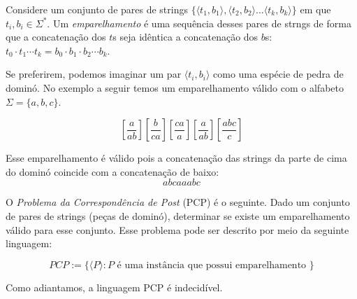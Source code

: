\begin{example}
  Considere um conjunto de pares de strings $\{\langle t_1, b_1 \rangle, \langle t_2, b_2 \rangle \dots \langle t_k, b_k \rangle\}$ em que $t_i, b_i \in \Sigma^*$.
  Um {\em emparelhamento} é uma sequência desses pares de strngs de forma que a concatenação dos $t$s seja idêntica a concatenação dos $b$s: $t_0 \cdot t_1 \cdots t_k = b_0 \cdot b_1 \cdot b_2 \cdots b_k$.

  Se preferirem, podemos imaginar um par $\langle t_i, b_i \rangle$ como uma espécie de pedra de dominó.
  No exemplo a seguir temos um emparelhamento válido com o alfabeto $\Sigma = \{a,b,c\}$.

  \begin{displaymath}
    \left[\frac{a}{ab}\right] \left[\frac{b}{ca}\right] \left[\frac{ca}{a}\right] \left[\frac{a}{ab}\right] \left[\frac{abc}{c}\right]
  \end{displaymath}

  Esse emparelhamento é válido pois a concatenação das strings da parte de cima do dominó coincide com a concatenação de baixo:
  \begin{displaymath}
    abcaaabc
  \end{displaymath}
  
  O {\em Problema da Correspondência de Post} (PCP) é o seguinte.
  Dado um conjunto de pares de strings (peças de dominó), determinar se existe um emparelhamento válido para esse conjunto.
  Esse problema pode ser descrito por meio da seguinte linguagem:
  
  \begin{displaymath}
    PCP := \{\langle P \rangle : P \textrm{ é uma instância que possui emparelhamento }\}
  \end{displaymath}

  Como adiantamos, a linguagem PCP é indecidível.
\end{example}

